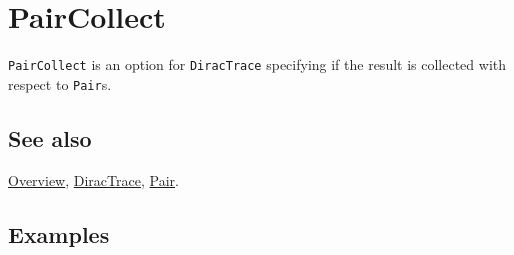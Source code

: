 \documentclass[../FeynCalcManual.tex]{subfiles}
\begin{document}
\hypertarget{paircollect}{
\section{PairCollect}\label{paircollect}}

\texttt{PairCollect} is an option for \texttt{DiracTrace} specifying if
the result is collected with respect to \texttt{Pair}s.

\subsection{See also}

\hyperlink{toc}{Overview}, \hyperlink{diractrace}{DiracTrace},
\hyperlink{pair}{Pair}.

\subsection{Examples}
\end{document}
